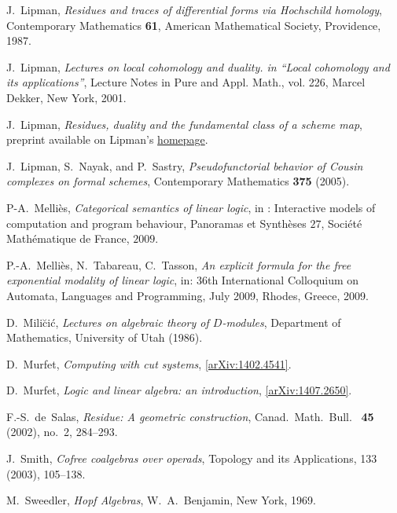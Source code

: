 \documentclass[english,letter paper,12pt,reqno]{article}
\theoremstyle{example}
\numberwithin{equation}{section}
\begin{document}
\begin{thebibliography}{BHLS03}
J.~Lipman, \textsl{Residues and traces of differential forms via {H}ochschild
  homology}, Contemporary Mathematics \textbf{61}, American Mathematical Society,
  Providence, 1987.

J.~Lipman, \emph{Lectures on local cohomology and duality. in ``{L}ocal cohomology
  and its applications''}, Lecture Notes in Pure and Appl. Math., vol. 226,
  Marcel Dekker, New York, 2001.

J.~Lipman, \textsl{Residues, duality and the fundamental class of a scheme map}, preprint available on Lipman's \href{http://www.math.purdue.edu/~Lipman/papers/Algecom.pdf}{homepage}.

J.~Lipman, S.~Nayak, and P.~Sastry, \emph{Pseudofunctorial behavior of {C}ousin
  complexes on formal schemes}, Contemporary Mathematics \textbf{375} (2005).

P-A.~Melli\`{e}s, \textsl{Categorical semantics of linear logic}, in : Interactive models of computation and program behaviour, Panoramas et Synth\`{e}ses $27$, Soci\'{e}t\'{e} Math\'{e}matique de France, $2009$.

P.-A.~Melli\`{e}s, N.~Tabareau, C.~Tasson, \textsl{An explicit formula for the free exponential modality of linear logic}, in: 36th International Colloquium on Automata, Languages and Programming, July 2009, Rhodes, Greece, 2009.

D.~Mili\u{c}i\'{c}, \textsl{Lectures on algebraic theory of $D$-modules}, Department of Mathematics, University of Utah (1986).

D.~Murfet, \textsl{Computing with cut systems}, \href{http://arxiv.org/abs/1402.4541}{[arXiv:1402.4541]}.

D.~Murfet, \textsl{Logic and linear algebra: an introduction}, \href{http://arxiv.org/abs/1407.2650}{[arXiv:1407.2650]}.

F.-S.~de~Salas, \textsl{Residue: A geometric construction}, Canad.~Math.~Bull.~
  \textbf{45} (2002), no.~2, 284--293.
  
J.~Smith, \textsl{Cofree coalgebras over operads}, Topology and its Applications, 133 (2003), 105--138.

M.~Sweedler, \textsl{Hopf Algebras}, W.~A.~Benjamin, New York, 1969.

\end{thebibliography}
\end{document}
